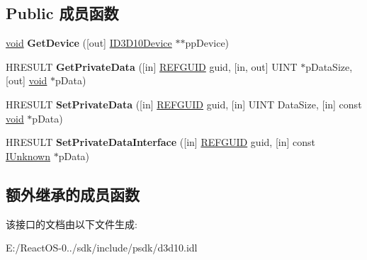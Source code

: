 \subsection*{Public 成员函数}
\begin{DoxyCompactItemize}
\item 
\mbox{\label{interface_i_d3_d10_device_child_a51eed7fe249f3c07c3432999b0419032}} 
\hyperlink{interfacevoid}{void} {\bfseries Get\+Device} (\mbox{[}out\mbox{]} \hyperlink{interface_i_d3_d10_device}{I\+D3\+D10\+Device} $\ast$$\ast$pp\+Device)
\item 
\mbox{\label{interface_i_d3_d10_device_child_a20e50052be3f612c9072312c9479aa48}} 
H\+R\+E\+S\+U\+LT {\bfseries Get\+Private\+Data} (\mbox{[}in\mbox{]} \hyperlink{struct___g_u_i_d}{R\+E\+F\+G\+U\+ID} guid, \mbox{[}in, out\mbox{]} U\+I\+NT $\ast$p\+Data\+Size, \mbox{[}out\mbox{]} \hyperlink{interfacevoid}{void} $\ast$p\+Data)
\item 
\mbox{\label{interface_i_d3_d10_device_child_a9007e09783e8f5506c8e5af8b0efb8df}} 
H\+R\+E\+S\+U\+LT {\bfseries Set\+Private\+Data} (\mbox{[}in\mbox{]} \hyperlink{struct___g_u_i_d}{R\+E\+F\+G\+U\+ID} guid, \mbox{[}in\mbox{]} U\+I\+NT Data\+Size, \mbox{[}in\mbox{]} const \hyperlink{interfacevoid}{void} $\ast$p\+Data)
\item 
\mbox{\label{interface_i_d3_d10_device_child_afaa9f3c3a13d9b2051b38c92ea3cedcb}} 
H\+R\+E\+S\+U\+LT {\bfseries Set\+Private\+Data\+Interface} (\mbox{[}in\mbox{]} \hyperlink{struct___g_u_i_d}{R\+E\+F\+G\+U\+ID} guid, \mbox{[}in\mbox{]} const \hyperlink{interface_i_unknown}{I\+Unknown} $\ast$p\+Data)
\end{DoxyCompactItemize}
\subsection*{额外继承的成员函数}


该接口的文档由以下文件生成\+:\begin{DoxyCompactItemize}
\item 
E\+:/\+React\+O\+S-\/0../sdk/include/psdk/d3d10.\+idl\end{DoxyCompactItemize}
